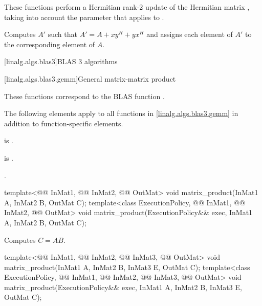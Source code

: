 \begin{itemdescr}
\pnum
These functions perform
a Hermitian rank-2 update of the Hermitian matrix ,
taking into account the  parameter
that applies to .

\pnum
\effects
Computes $A'$ such that $A' = A + x y^H + y x^H$ and
assigns each element of $A'$ to the corresponding element of $A$.
\end{itemdescr}

[linalg.algs.blas3]{BLAS 3 algorithms}

[linalg.algs.blas3.gemm]{General matrix-matrix product}

\pnum
\begin{note}
These functions correspond to the BLAS function \supercite{blas3}.
\end{note}

\pnum
The following elements apply
to all functions in \ref{linalg.algs.blas3.gemm}
in addition to function-specific elements.

\pnum
\mandates
{}
is .

\pnum
\expects
{} is .

\pnum
\complexity
{}.

%
\begin{itemdecl}
  template<@@ InMat1, @@ InMat2, @@ OutMat>
    void matrix_product(InMat1 A, InMat2 B, OutMat C);
  template<class ExecutionPolicy, @@ InMat1, @@ InMat2, @@ OutMat>
    void matrix_product(ExecutionPolicy&& exec, InMat1 A, InMat2 B, OutMat C);
\end{itemdecl}

\begin{itemdescr}
\pnum
\effects
Computes $C = A B$.
\end{itemdescr}

%
\begin{itemdecl}
template<@@ InMat1, @@ InMat2, @@ InMat3, @@ OutMat>
  void matrix_product(InMat1 A, InMat2 B, InMat3 E, OutMat C);
template<class ExecutionPolicy,
         @@ InMat1, @@ InMat2, @@ InMat3, @@ OutMat>
  void matrix_product(ExecutionPolicy&& exec, InMat1 A, InMat2 B, InMat3 E, OutMat C);
\end{itemdecl}

